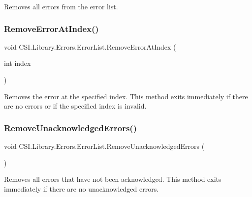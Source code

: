 Removes all errors from the error list. 

\mbox{\label{class_c_s_i_1_1_library_1_1_errors_1_1_error_list_a1e109d782cb81a4f5ce88599a97cf662}} 
\subsubsection{\texorpdfstring{RemoveErrorAtIndex()}{RemoveErrorAtIndex()}}
{\footnotesize\ttfamily void C\+S\+I.\+Library.\+Errors.\+Error\+List.\+Remove\+Error\+At\+Index (\begin{DoxyParamCaption}\item[{int}]{index }\end{DoxyParamCaption})\hspace{0.3cm}{\ttfamily [inline]}}



Removes the error at the specified index. This method exits immediately if there are no errors or if the specified index is invalid. 

\mbox{\label{class_c_s_i_1_1_library_1_1_errors_1_1_error_list_a41a138258732ef270f0089ac818617dd}} 
\subsubsection{\texorpdfstring{RemoveUnacknowledgedErrors()}{RemoveUnacknowledgedErrors()}}
{\footnotesize\ttfamily void C\+S\+I.\+Library.\+Errors.\+Error\+List.\+Remove\+Unacknowledged\+Errors (\begin{DoxyParamCaption}{ }\end{DoxyParamCaption})\hspace{0.3cm}{\ttfamily [inline]}}



Removes all errors that have not been acknowledged. This method exits immediately if there are no unacknowledged errors. 


